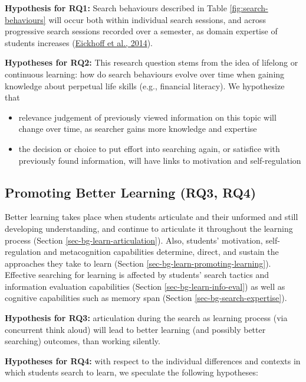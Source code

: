 \documentclass[letterpaper, nobind]{templates/ociamthesis}
\providecommand{\tightlist}{%
  \setlength{\itemsep}{0pt}\setlength{\parskip}{0pt}}
\begin{document}
\textbf{Hypothesis for RQ1:} Search behaviours described in Table \ref{fig:search-behaviours} will occur both within individual search sessions, and across progressive search sessions recorded over a semester, as domain expertise of students increases (\protect\hyperlink{ref-eickhoff2014lessons}{Eickhoff et al., 2014}).

\textbf{Hypotheses for RQ2:} This research question stems from the idea of lifelong or continuous learning: how do search behaviours evolve over time when gaining knowledge about perpetual life skills (e.g., financial literacy). We hypothesize that

\begin{itemize}
\tightlist
\item
  relevance judgement of previously viewed information on this topic will change over time, as searcher gains more knowledge and expertise
\item
  the decision or choice to put effort into searching again, or satisfice with previously found information, will have links to motivation and self-regulation
\end{itemize}

\hypertarget{sec-framework-rq3-rq4}{%
\subsection{Promoting Better Learning (RQ3, RQ4)}\label{sec-framework-rq3-rq4}}

Better learning takes place when students articulate and their unformed
and still developing understanding, and continue to articulate it
throughout the learning process (Section \ref{sec-bg-learn-articulation}). Also, students' motivation,
self-regulation and metacognition capabilities determine, direct, and
sustain the approaches they take to learn (Section \ref{sec-bg-learn-promoting-learning}). Effective searching for
learning is affected by students' search tactics and information
evaluation capabilities (Section \ref{sec-bg-learn-info-eval}) as well as cognitive capabilities
such as memory span (Section \ref{sec-bg-search-expertise}).

\textbf{Hypothesis for RQ3:} articulation during the search as learning
process (via concurrent think aloud) will lead to better learning (and
possibly better searching) outcomes, than working silently.

\textbf{Hypotheses for RQ4:} with respect to the individual differences and
contexts in which students search to learn, we speculate the following
hypotheses:
\end{document}
